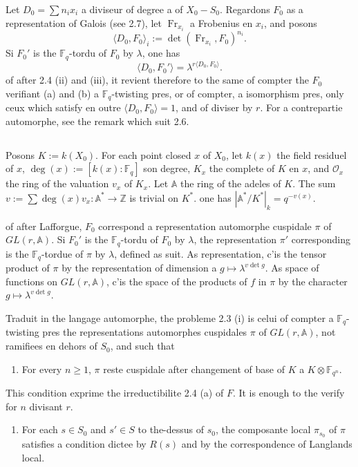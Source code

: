 \documentclass[11pt,a4paper]{article}
\theoremstyle{plain}
\theoremstyle{definition}
\DeclareMathOperator{\Fr}{Fr}
\newcommand{\Z}{\mathbb{Z}}
\newcommand{\F}{\mathbb{F}}
\begin{document}
Let $D_0 = \sum n_i x_i$ a diviseur of degree a of $X_0 - S_0$. Regardons $F_0$ as a representation of Galois (see 2.7), let $\Fr_{x_i}$ a Frobenius en $x_i$, and posons
\[
\langle D_0, F_0 \rangle_i := \det(\Fr_{x_i}, F_0)^{n_i}.
\]
Si $F_0'$ is the $\F_q$-tordu of $F_0$ by $\lambda$, one has
\[
\langle D_0, F_0' \rangle = \lambda^{r \langle D_0, F_0 \rangle}.
\]
of after 2.4 (ii) and (iii), it revient therefore to the same of compter the $F_0$ verifiant (a) and (b) a $\F_q$-twisting pres, or of compter, a isomorphism pres, only ceux which satisfy en outre $\langle D_0, F_0 \rangle = 1$, and of diviser by $r$. For a contrepartie automorphe, see the remark which suit 2.6.

\subsection{}
Posons $K := k(X_0)$. For each point closed $x$ of $X_0$, let $k(x)$ the field residuel of $x$, $\deg(x) := [k(x): \F_q]$ son degree, $K_x$ the complete of $K$ en $x$, and $\mathcal{O}_x$ the ring of the valuation $v_x$ of $K_x$. Let $\mathbb{A}$ the ring of the adeles of $K$. The sum $v := \sum \deg(x) v_x: \mathbb{A}^* \to \Z$ is trivial on $K^*$. one has $|\mathbb{A}^*/K^*|_k = q^{-v(x)}$.

of after Lafforgue, $F_0$ correspond a representation automorphe cuspidale $\pi$ of $GL(r, \mathbb{A})$. Si $F_0'$ is the $\F_q$-tordu of $F_0$ by $\lambda$, the representation $\pi'$ corresponding is the $\F_q$-tordue of $\pi$ by $\lambda$, defined as suit. As representation, c'is the tensor product of $\pi$ by the representation of dimension a $g \mapsto \lambda^{v \det g}$. As space of functions on $GL(r, \mathbb{A})$, c'is the space of the products of $f$ in $\pi$ by the character $g \mapsto \lambda^{v \det g}$.

Traduit in the langage automorphe, the probleme 2.3 (i) is celui of compter a $\F_q$-twisting pres the representations automorphes cuspidales $\pi$ of $GL(r, \mathbb{A})$, not ramifiees en dehors of $S_0$, and such that
\begin{enumerate}[label=(\alph*$'$)]
\item For every $n \geq 1$, $\pi$ reste cuspidale after changement of base of $K$ a $K \otimes \F_{q^n}$.
\end{enumerate}
This condition exprime the irreductibilite 2.4 (a) of $F$. It is enough to the verify for $n$ divisant $r$.
\begin{enumerate}[label=(\alph*$'$),start=2]
\item For each $s \in S_0$ and $s' \in S$ to the-dessus of $s_0$, the composante local $\pi_{s_0}$ of $\pi$ satisfies a condition dictee by $R(s)$ and by the correspondence of Langlands local.
\end{enumerate}
\end{document}

